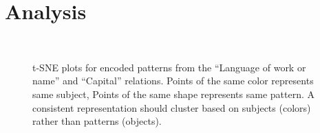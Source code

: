 \section{Analysis}
\label{sec:analysis}



\begin{figure}[t!]
\centering

\\
{}


\caption{t-SNE plots for encoded patterns from the ``Language of work or name'' and ``Capital'' relations. Points of the same color represents same subject, Points of the same shape represents same pattern. A consistent representation should cluster based on subjects (colors) rather than patterns (objects).}
\label{fig:tsne-emb}

\end{figure}